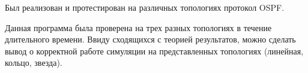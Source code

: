 Был реализован и протестирован на различных топологиях протокол OSPF. 

Данная программа была проверена на трех разных топологиях в течение длительного времени. Ввиду сходящихся с теорией результатов, можно сделать вывод о корректной работе симуляции на представленных топологиях (линейная, кольцо, звезда).